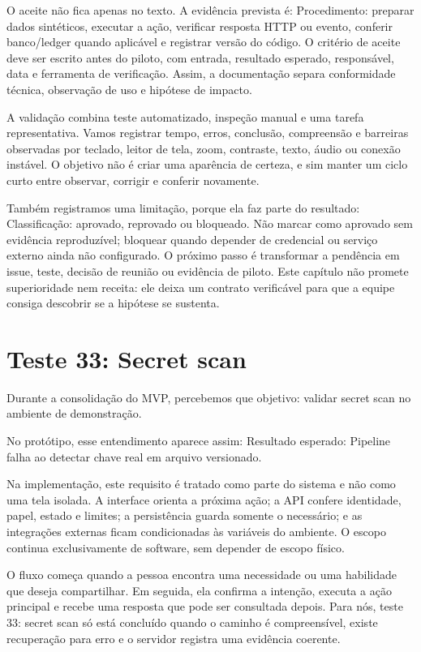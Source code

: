 \documentclass[12pt,oneside,a4paper,article]{abntex2}
\begin{document}
O aceite não fica apenas no texto. A evidência prevista é: Procedimento: preparar dados sintéticos, executar a ação, verificar resposta HTTP ou evento, conferir banco/ledger quando aplicável e registrar versão do código. O critério de aceite deve ser escrito antes do piloto, com entrada, resultado esperado, responsável, data e ferramenta de verificação. Assim, a documentação separa conformidade técnica, observação de uso e hipótese de impacto.

A validação combina teste automatizado, inspeção manual e uma tarefa representativa. Vamos registrar tempo, erros, conclusão, compreensão e barreiras observadas por teclado, leitor de tela, zoom, contraste, texto, áudio ou conexão instável. O objetivo não é criar uma aparência de certeza, e sim manter um ciclo curto entre observar, corrigir e conferir novamente.

Também registramos uma limitação, porque ela faz parte do resultado: Classificação: aprovado, reprovado ou bloqueado. Não marcar como aprovado sem evidência reproduzível; bloquear quando depender de credencial ou serviço externo ainda não configurado. O próximo passo é transformar a pendência em issue, teste, decisão de reunião ou evidência de piloto. Este capítulo não promete superioridade nem receita: ele deixa um contrato verificável para que a equipe consiga descobrir se a hipótese se sustenta.

\section{Teste 33: Secret scan}
Durante a consolidação do MVP, percebemos que objetivo: validar secret scan no ambiente de demonstração.

No protótipo, esse entendimento aparece assim: Resultado esperado: Pipeline falha ao detectar chave real em arquivo versionado.

Na implementação, este requisito é tratado como parte do sistema e não como uma tela isolada. A interface orienta a próxima ação; a API confere identidade, papel, estado e limites; a persistência guarda somente o necessário; e as integrações externas ficam condicionadas às variáveis do ambiente. O escopo continua exclusivamente de software, sem depender de escopo físico.

O fluxo começa quando a pessoa encontra uma necessidade ou uma habilidade que deseja compartilhar. Em seguida, ela confirma a intenção, executa a ação principal e recebe uma resposta que pode ser consultada depois. Para nós, teste 33: secret scan só está concluído quando o caminho é compreensível, existe recuperação para erro e o servidor registra uma evidência coerente.
\end{document}
